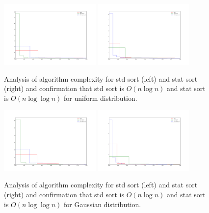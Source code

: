 \documentclass[12pt]{article}
\begin{document}
        \begin{figure}
		\begin{center}
			\includegraphics[width=0.44\textwidth]{fig_dist_anal_uniform_stdsort.png}
			\includegraphics[width=0.44\textwidth]{fig_dist_anal_uniform_statsort.png}
		\end{center}
		\caption{Analysis of algorithm complexity for std sort (left) and stat sort (right) and confirmation that std sort is $O(n \log n)$ and stat sort is $O(n \log \log n)$ for uniform distribution.}
		\label{fig5}
		\end{figure}	

        \begin{figure}
		\begin{center}
			\includegraphics[width=0.44\textwidth]{fig_dist_anal_gauss_stdsort.png}
			\includegraphics[width=0.44\textwidth]{fig_dist_anal_gauss_statsort.png}
		\end{center}
		\caption{Analysis of algorithm complexity for std sort (left) and stat sort (right) and confirmation that std sort is $O(n \log n)$ and stat sort is $O(n \log \log n)$ for Gaussian distribution.}
		\label{fig6}
		\end{figure}	
\end{document}
